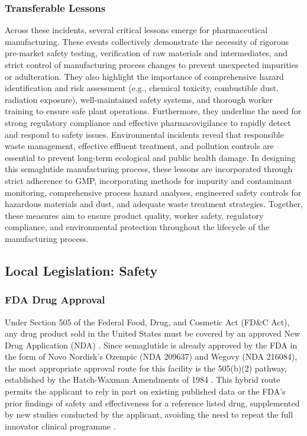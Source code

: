 \subsubsection{Transferable Lessons}

Across these incidents, several critical lessons emerge for pharmaceutical manufacturing. These events collectively demonstrate the necessity of rigorous pre-market safety testing, verification of raw materials and intermediates, and strict control of manufacturing process changes to prevent unexpected impurities or adulteration. They also highlight the importance of comprehensive hazard identification and risk assessment (e.g., chemical toxicity, combustible dust, radiation exposure), well-maintained safety systems, and thorough worker training to ensure safe plant operations. Furthermore, they underline the need for strong regulatory compliance and effective pharmacovigilance to rapidly detect and respond to safety issues. Environmental incidents reveal that responsible waste management, effective effluent treatment, and pollution controls are essential to prevent long-term ecological and public health damage. In designing this semaglutide manufacturing process, these lessons are incorporated through strict adherence to GMP, incorporating methods for impurity and contaminant monitoring, comprehensive process hazard analyses, engineered safety controls for hazardous materials and dust, and adequate waste treatment strategies. Together, these measures aim to ensure product quality, worker safety, regulatory compliance, and environmental protection throughout the lifecycle of the manufacturing process.

\subsection{Local Legislation: Safety}

\subsubsection{FDA Drug Approval}

Under Section 505 of the Federal Food, Drug, and Cosmetic Act (FD\&C Act), any drug product sold in the United States must be covered by an approved New Drug Application (NDA) \cite{eCFR_21CFR50}. Since semaglutide is already approved by the FDA in the form of Novo Nordisk's Ozempic (NDA 209637) and Wegovy (NDA 216084), the most appropriate approval route for this facility is the 505(b)(2) pathway, established by the Hatch-Waxman Amendments of 1984 \cite{Allucent_505b2}. This hybrid route permits the applicant to rely in part on existing published data or the FDA's prior findings of safety and effectiveness for a reference listed drug, supplemented by new studies conducted by the applicant, avoiding the need to repeat the full innovator clinical programme \cite{Salminen_2023}.

